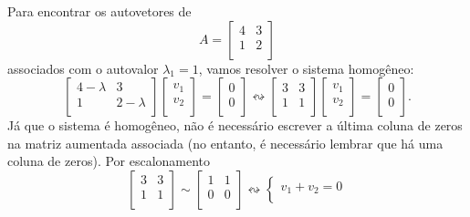 \documentclass[../livro.tex]{subfiles}  %
\begin{document}
\begin{example}
	Para encontrar os autovetores de
	\[
	A =
	\left[
	\begin{array}{cc}
	4 & 3 \\
	1 & 2 \\
	\end{array}
	\right]
	\] associados com o autovalor $\lambda_1 = 1$, vamos resolver o sistema homogêneo:
	\[
	\left[
	\begin{array}{cc}
	4-\lambda & 3 \\
	1 & 2-\lambda \\
	\end{array}
	\right] \left[
	\begin{array}{c}
	v_1 \\
	v_2 \\
	\end{array}
	\right] = \left[
	\begin{array}{c}
	0 \\
	0 \\
	\end{array}
	\right] \leftrightsquigarrow
	\left[
	\begin{array}{cc}
	3 & 3 \\
	1 & 1 \\
	\end{array}
	\right] \left[
	\begin{array}{c}
	v_1 \\
	v_2 \\
	\end{array}
	\right] = \left[
	\begin{array}{c}
	0 \\
	0 \\
	\end{array}
	\right].
	\] Já que o sistema é homogêneo, não é necessário escrever a última coluna de zeros na matriz aumentada associada (no entanto, é necessário lembrar que há uma coluna de zeros). Por escalonamento
	\[
	\left[
	\begin{array}{cc}
	3 & 3 \\
	1 & 1 \\
	\end{array}
	\right] \sim
	\left[
	\begin{array}{cc}
	1 & 1 \\
	0 & 0 \\
	\end{array}
	\right] \leftrightsquigarrow
	\left\{
	\begin{array}{ll}
	v_1 + v_2 = 0 \\

\end{array}\]
\end{example}
\end{document}

